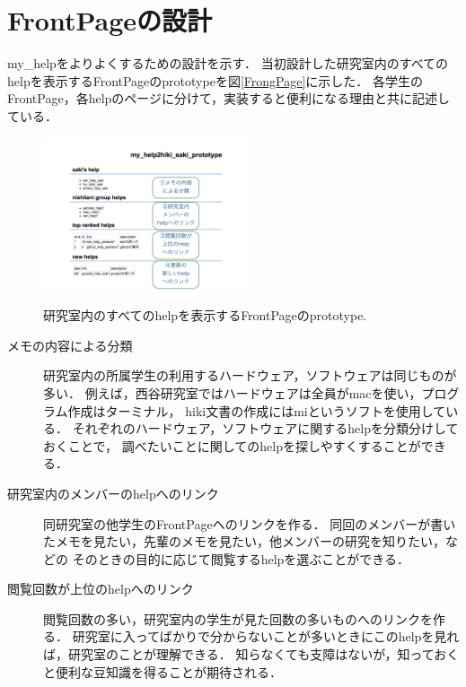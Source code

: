 \section{FrontPageの設計}
my\_helpをよりよくするための設計を示す．
当初設計した研究室内のすべてのhelpを表示するFrontPageのprototypeを図\ref{FrongPage}に示した．
各学生のFrontPage，各helpのページに分けて，実装すると便利になる理由と共に記述している．

\begin{figure}[htbp]
\begin{center}
\includegraphics[width=6.0cm,bb=0 0 600 800]{my_help2hiki_saki.014.png}
\caption{研究室内のすべてのhelpを表示するFrontPageのprototype.}
\label{FrongPage}
\label{default}\end{center}\end{figure}


\begin{description}
\item[メモの内容による分類] 研究室内の所属学生の利用するハードウェア，ソフトウェアは同じものが多い．
例えば，西谷研究室ではハードウェアは全員がmacを使い，プログラム作成はターミナル，
hiki文書の作成にはmiというソフトを使用している．
それぞれのハードウェア，ソフトウェアに関するhelpを分類分けしておくことで，
調べたいことに関してのhelpを探しやすくすることができる．
\item[研究室内のメンバーのhelpへのリンク]
同研究室の他学生のFrontPageへのリンクを作る．
同回のメンバーが書いたメモを見たい，先輩のメモを見たい，他メンバーの研究を知りたい，などの
そのときの目的に応じて閲覧するhelpを選ぶことができる．
\end{description}

\begin{description}
\item[閲覧回数が上位のhelpへのリンク]
閲覧回数の多い，研究室内の学生が見た回数の多いものへのリンクを作る．
研究室に入ってばかりで分からないことが多いときにこのhelpを見れば，研究室のことが理解できる．
知らなくても支障はないが，知っておくと便利な豆知識を得ることが期待される．
\end{description}

